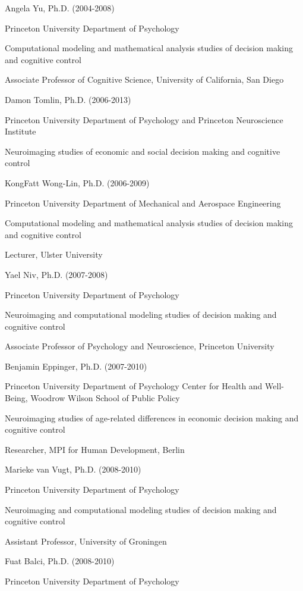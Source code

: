 \documentclass[10 pt]{article}
\begin{document}
Angela Yu, Ph.D. (2004-2008)

Princeton University Department of Psychology

Computational modeling and mathematical analysis studies of decision making and cognitive control

Associate Professor of Cognitive Science, University of California, San Diego
    \medskip

Damon Tomlin, Ph.D. (2006-2013)

Princeton University Department of Psychology and Princeton Neuroscience Institute

Neuroimaging studies of economic and social decision making and cognitive control
    \medskip

KongFatt Wong-Lin, Ph.D. (2006-2009)

Princeton University Department of Mechanical and Aerospace Engineering

Computational modeling and mathematical analysis studies of decision making and cognitive control

Lecturer, Ulster University
    \medskip

Yael Niv, Ph.D. (2007-2008)

Princeton University Department of Psychology

Neuroimaging and computational modeling studies of decision making and cognitive control

Associate Professor of Psychology and Neuroscience, Princeton University
    \medskip

Benjamin Eppinger, Ph.D. (2007-2010)

Princeton University Department of Psychology
Center for Health and Well-Being, Woodrow Wilson School of Public Policy

Neuroimaging studies of age-related differences in economic decision making and cognitive control

Researcher, MPI for Human Development, Berlin
    \medskip

Marieke van Vugt, Ph.D. (2008-2010)

Princeton University Department of Psychology

Neuroimaging and computational modeling studies of decision making and cognitive control

Assistant Professor, University of Groningen
    \medskip

Fuat Balci, Ph.D. (2008-2010)

Princeton University Department of Psychology
\end{document}
